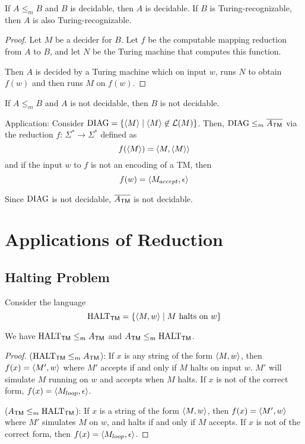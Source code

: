 \begin{theorem}
    If $A \leq_m B$ and $B$ is decidable, then $A$ is decidable. If $B$ is Turing-recognizable, then $A$ is also Turing-recognizable.
\end{theorem}

\begin{proof}
    Let $M$ be a decider for $B$. Let $f$ be the computable mapping reduction from $A$ to $B$, and let $N$ be the Turing machine that computes this function.

    Then $A$ is decided by a Turing machine which on input $w$, runs $N$ to obtain $f(w)$ and then runs $M$ on $f(w)$.
\end{proof}

\begin{corollary}
    If $A \leq_m B$ and $A$ is not decidable, then $B$ is not decidable.
\end{corollary}

Application: Consider $\mathrm{DIAG} = \{ \langle M \rangle \mid \langle M \rangle \not\in \mathcal{L}(M) \}$. Then, $\mathrm{DIAG} \leq_m \overline{A_{\mathsf{TM}}}$ via the reduction $f:\, \Sigma^* \to \Sigma^*$ defined as
$$
f(\langle M \rangle) = \langle M,\langle M \rangle \rangle
$$
and if the input $w$ to $f$ is not an encoding of a TM, then
$$
f(w) = \langle M_{accept}, \epsilon \rangle
$$

Since $\mathrm{DIAG}$ is not decidable, $\overline{A_{\mathsf{TM}}}$ is not decidable.

\section{Applications of Reduction}

\subsection{Halting Problem}

Consider the language
$$
\mathrm{HALT}_{\mathsf{TM}} = \{ \langle M,w \rangle \mid \text{$M$ halts on $w$} \}
$$

We have $\mathrm{HALT}_{\mathsf{TM}} \leq_m A_{\mathsf{TM}}$ and $A_{\mathsf{TM}} \leq_m \mathrm{HALT}_{\mathsf{TM}}$.

\begin{proof}

    \hfill
    
    ($\mathrm{HALT}_{\mathsf{TM}} \leq_m A_{\mathsf{TM}}$): If $x$ is any string of the form $\langle M,w \rangle$, then $f(x) = \langle M',w \rangle$ where $M'$ accepts if and only if $M$ halts on input $w$. $M'$ will simulate $M$ running on $w$ and accepts when $M$ halts. If $x$ is not of the correct form, $f(x) = \langle M_{loop},\epsilon \rangle$.

    ($A_{\mathsf{TM}} \leq_m \mathrm{HALT}_{\mathsf{TM}}$): If $x$ is a string of the form $\langle M,w \rangle$, then $f(x) = \langle M',w \rangle$ where $M'$ simulates $M$ on $w$, and halts if and only if $M$ accepts. If $x$ is not of the correct form, then $f(x) = \langle M_{loop}, \epsilon \rangle$.
\end{proof}

